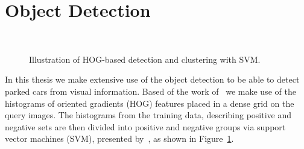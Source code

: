     \section{Object Detection}\label{sec:object_detection}
        \begin{figure}[th]%
            \centering
            \\
            \caption{Illustration of HOG-based detection and clustering with SVM.}
            \label{fig:det_to_svm}
        \end{figure}
        In this thesis we make extensive use of the object detection to be able to
        detect parked cars from visual information. Based of the work
        of~\cite{dalal2005} we make use of the histograms of oriented gradients
        (HOG) features placed in a dense grid on the query images. The histograms
        from the training data, describing positive and negative sets are then
        divided into positive and negative groups via support vector machines
        (SVM), presented by~\cite{svm2003}, as shown in Figure~\ref{fig:det_to_svm}.

